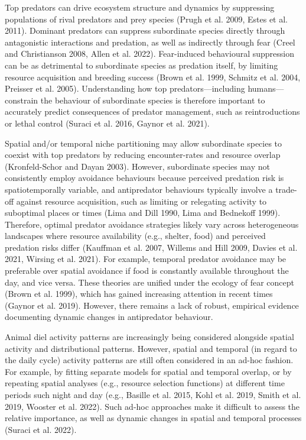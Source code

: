 \documentclass[preprint, 3p, authoryear]{elsarticle} %
\begin{document}
Top predators can drive ecosystem structure and dynamics by suppressing populations of rival predators and prey species (Prugh et al. 2009, Estes et al. 2011). Dominant predators can suppress subordinate species directly through antagonistic interactions and predation, as well as indirectly through fear (Creel and Christianson 2008, Allen et al. 2022). Fear-induced behavioural suppression can be as detrimental to subordinate species as predation itself, by limiting resource acquisition and breeding success (Brown et al. 1999, Schmitz et al. 2004, Preisser et al. 2005). Understanding how top predators---including humans---constrain the behaviour of subordinate species is therefore important to accurately predict consequences of predator management, such as reintroductions or lethal control (Suraci et al. 2016, Gaynor et al. 2021).

Spatial and/or temporal niche partitioning may allow subordinate species to coexist with top predators by reducing encounter-rates and resource overlap (Kronfeld-Schor and Dayan 2003). However, subordinate species may not consistently employ avoidance behaviours because perceived predation risk is spatiotemporally variable, and antipredator behaviours typically involve a trade-off against resource acquisition, such as limiting or relegating activity to suboptimal places or times (Lima and Dill 1990, Lima and Bednekoff 1999). Therefore, optimal predator avoidance strategies likely vary across heterogeneous landscapes where resource availability (e.g., shelter, food) and perceived predation risks differ (Kauffman et al. 2007, Willems and Hill 2009, Davies et al. 2021, Wirsing et al. 2021). For example, temporal predator avoidance may be preferable over spatial avoidance if food is constantly available throughout the day, and vice versa. These theories are unified under the ecology of fear concept (Brown et al. 1999), which has gained increasing attention in recent times (Gaynor et al. 2019). However, there remains a lack of robust, empirical evidence documenting dynamic changes in antipredator behaviour.

Animal diel activity patterns are increasingly being considered alongside spatial activity and distributional patterns. However, spatial and temporal (in regard to the daily cycle) activity patterns are still often considered in an ad-hoc fashion. For example, by fitting separate models for spatial and temporal overlap, or by repeating spatial analyses (e.g., resource selection functions) at different time periods such night and day (e.g., Basille et al. 2015, Kohl et al. 2019, Smith et al. 2019, Wooster et al. 2022). Such ad-hoc approaches make it difficult to assess the relative importance, as well as dynamic changes in spatial and temporal processes (Suraci et al. 2022).
\end{document}
